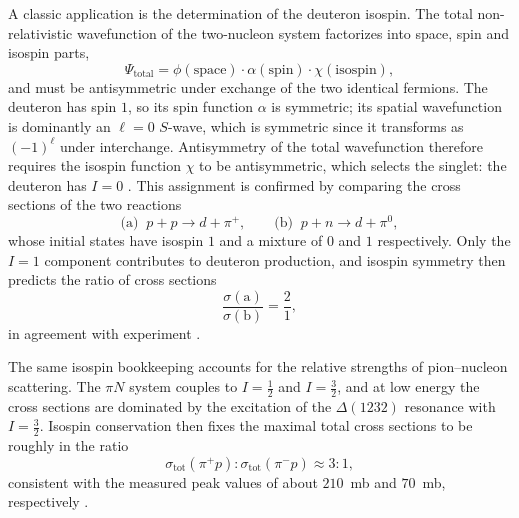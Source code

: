 A classic application is the determination of the deuteron isospin. The total
non-relativistic wavefunction of the two-nucleon system factorizes into space, spin
and isospin parts,
\begin{equation}
    \Psi_{\mathrm{total}} = \phi(\mathrm{space}) \cdot \alpha(\mathrm{spin})
    \cdot \chi(\mathrm{isospin}),
\end{equation}
and must be antisymmetric under exchange of the two identical fermions. The deuteron
has spin $1$, so its spin function $\alpha$ is symmetric; its spatial wavefunction is
dominantly an $\ell = 0$ $S$-wave, which is symmetric since it transforms as
$(-1)^\ell$ under interchange. Antisymmetry of the total wavefunction therefore
requires the isospin function $\chi$ to be antisymmetric, which selects the singlet:
the deuteron has $I = 0$ \cite[Ch.~3]{Amsler2018}. This assignment is confirmed by
comparing the cross sections of the two reactions
\begin{equation}
    \text{(a)}\;\; p + p \to d + \pi^+,
    \qquad
    \text{(b)}\;\; p + n \to d + \pi^0,
\end{equation}
whose initial states have isospin $1$ and a mixture of $0$ and $1$ respectively. Only
the $I = 1$ component contributes to deuteron production, and isospin symmetry then
predicts the ratio of cross sections
\begin{equation}
    \frac{\sigma(\text{a})}{\sigma(\text{b})} = \frac{2}{1},
\end{equation}
in agreement with experiment \cite[Ch.~3]{Amsler2018}.

The same isospin bookkeeping accounts for the relative strengths of pion--nucleon
scattering. The $\pi N$ system couples to $I = \tfrac{1}{2}$ and $I = \tfrac{3}{2}$,
and at low energy the cross sections are dominated by the excitation of the
$\Delta(1232)$ resonance with $I = \tfrac{3}{2}$. Isospin conservation then fixes the
maximal total cross sections to be roughly in the ratio
\begin{equation}
    \sigma_{\mathrm{tot}}(\pi^+ p) : \sigma_{\mathrm{tot}}(\pi^- p) \approx 3 : 1 ,
\end{equation}
consistent with the measured peak values of about $210$~mb and $70$~mb, respectively
\cite[Ch.~3]{Amsler2018}.

